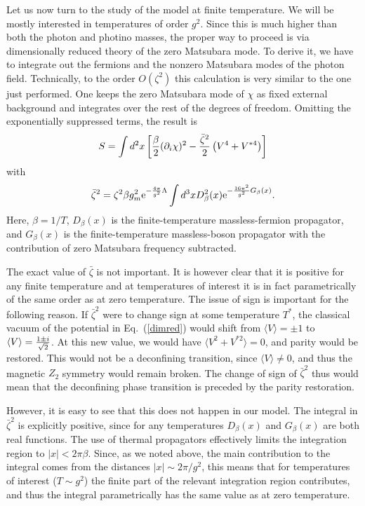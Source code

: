 \documentclass[a4paper,12pt]{article}
\begin{document}
Let us now turn to the study of the model at finite temperature.
We will be mostly interested in temperatures of order $g^2$. Since
this is much higher than both the photon and photino masses, the
proper way to proceed is via dimensionally reduced theory of the
zero Matsubara mode. To derive it, we have to integrate out the
fermions and the nonzero Matsubara modes of the photon field.
Technically, to the order $O\left(\zeta^2\right)$ this calculation
is very similar to the one just performed. One keeps the zero
Matsubara mode of $\chi$ as fixed external background and
integrates over the rest of the degrees of freedom. Omitting the
exponentially suppressed terms, the result is
\begin{equation}
S=  \int d^2x\left[\frac\beta2(\partial_i\chi)^2- {\bar\zeta
^2\over 2}\left(V^4+V^{*4}\right)\right]\label{dimred}\end{equation} with
\begin{equation}
\bar\zeta^2= \zeta^2\beta g_m^2 {\rm e}^{-{4\pi\over
g^2}\Lambda}\int d^3x D_\beta^2(x){\rm e}^{-{16\pi^2\over g^2}
G_\beta(x)}.
\end{equation} Here, $\beta=1/T$, $D_\beta(x)$ is the finite-temperature
massless-fermion propagator, and $G_\beta(x)$ is the finite-temperature
massless-boson propagator with the contribution of
zero Matsubara frequency subtracted.

The exact value of $\bar\zeta$ is not important. It is however
clear that it is positive for any finite temperature and at
temperatures of interest it is in fact parametrically of the same
order as at zero temperature. The issue of sign is important for
the following reason. If $\bar\zeta^2$ were to change sign at some
temperature $T^*$, the classical vacuum of the potential in
Eq.~(\ref{dimred}) would shift from $\langle V\rangle=\pm 1$ to
$\langle V\rangle={1\pm i\over \sqrt 2}$. At this new value, we
would have $\langle V^2+V^{*2}\rangle=0$, and parity would be
restored. This would not be a deconfining transition, since
$\langle V\rangle\ne 0$, and thus the magnetic $Z_2$ symmetry would remain
broken. The change of sign of $\bar\zeta^2$ thus would mean that
the deconfining phase transition is preceded by the parity
restoration.

However, it is easy to see that this does not happen in our model.
The integral in $\bar\zeta^2$ is explicitly positive, since for any
temperatures $D_\beta(x)$ and $G_\beta(x)$ are both real functions. The
use of thermal propagators effectively limits the integration
region to $|x|<2\pi\beta$. Since, as we noted above, the main
contribution to the integral comes from the distances $|x|\sim
2\pi/g^2$, this means that for temperatures of interest ($T\sim
g^2$) the finite part of the relevant integration region
contributes, and thus the integral parametrically has the same
value as at zero temperature.
\end{document}
